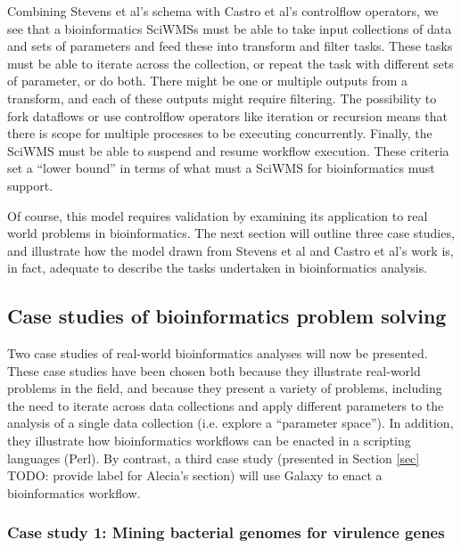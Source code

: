 \documentclass[a4paper,10pt]{scrreprt} \usepackage[utf8]{inputenc}
\begin{document}
Combining Stevens et al's schema with Castro et al's \gls{controlflow}
operators, we see that a bioinformatics \glspl{SciWMS} must be able to take
input collections of data and sets of parameters and feed these into transform
and filter tasks. These tasks must be able to iterate across the collection, or
repeat the task with different sets of parameter, or do both.
There might be one or multiple outputs from a transform, and each of these
outputs might require filtering. The possibility to fork \glspl{dataflow} or use
\gls{controlflow} operators like iteration or recursion means that there is
scope for multiple processes to be executing concurrently. Finally, the
\gls{SciWMS} must be able to suspend and resume workflow execution. These
criteria set a ``lower bound'' in terms of what must a \gls{SciWMS} for
bioinformatics must support.

Of course, this model requires validation by examining its application to real
world problems in bioinformatics. The next section will outline three case
studies, and illustrate how the model drawn from Stevens et al
\cite{stevens_classification_2001} and Castro et al's
\cite{castro_workflows_2005} work is, in fact, adequate to describe the tasks
undertaken in bioinformatics analysis.

\subsection{Case studies of bioinformatics problem solving}
\label{sec:case_studies}

Two case studies of real-world bioinformatics analyses will now be presented.
These case studies have been chosen both because they illustrate real-world problems in the field,
and because they present a variety of problems, including the need to iterate across data collections and apply
different parameters to the analysis of a single data collection (i.e. explore a ``parameter space''). In addition, 
they illustrate how bioinformatics \glspl{workflow} can be enacted in a scripting languages (Perl). By contrast,
a third case study (presented in Section \ref{sec} TODO: provide label for Alecia's section) will use Galaxy
to enact a bioinformatics \gls{workflow}.

\subsubsection{Case study 1: Mining bacterial genomes for virulence genes}
\label{sec:case_studies_panji}
\end{document}
